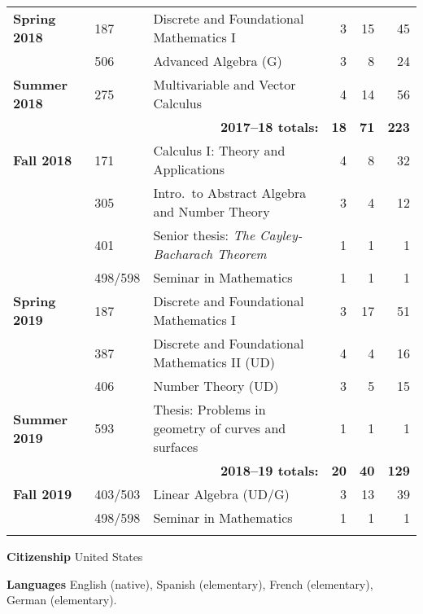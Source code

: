 \documentclass[12pt]{article}
\begin{document}
\begin{center}
\begin{longtable}{@{} l l l rrr @{}}
\textbf{Spring 2018} & 187 & Discrete and Foundational Mathematics I & 3 & 15 & 45 \\
 & 506 & Advanced Algebra (G) & 3 & 8 & 24 \\
\addlinespace[0.1in]

\textbf{Summer 2018} & 275 & Multivariable and Vector Calculus & 4 & 14 & 56 \\

 \cmidrule{3-6}
 & & \multicolumn{1}{r}{\textbf{2017--18 totals:}} & \textbf{18} & \textbf{71} & \textbf{223} \\
 \cmidrule{3-6}

\textbf{Fall 2018} & 171 & Calculus I: Theory and Applications & 4 & 8 & 32 \\
 & 305 & Intro.\ to Abstract Algebra and Number Theory & 3 & 4 & 12 \\
 & 401 & Senior thesis: \emph{The Cayley-Bacharach Theorem} & 1 & 1 & 1 \\
 & 498/598 & Seminar in Mathematics & 1 & 1 & 1 \\
\addlinespace[0.1in]

\textbf{Spring 2019} & 187 & Discrete and Foundational Mathematics I & 3 & 17 & 51 \\
 & 387 & Discrete and Foundational Mathematics II (UD) & 4 & 4 & 16 \\
 & 406 & Number Theory (UD) & 3 & 5 & 15 \\
\addlinespace[0.1in]

\textbf{Summer 2019} & 593 & Thesis: Problems in geometry of curves and surfaces & 1 & 1 & 1 \\

 \cmidrule{3-6}
 & & \multicolumn{1}{r}{\textbf{2018--19 totals:}} & \textbf{20} & \textbf{40} & \textbf{129} \\
 \cmidrule{3-6}


\textbf{Fall 2019} & 403/503 & Linear Algebra (UD/G) & 3 & 13 & 39 \\
 & 498/598 & Seminar in Mathematics & 1 & 1 & 1 \\
\addlinespace[0.1in]

\bottomrule


\end{longtable}
\end{center}




\textbf{Citizenship}
\quad United States
\bigskip


\textbf{Languages}
\quad English (native), Spanish (elementary), French (elementary), German (elementary).
\bigskip
\end{document}
